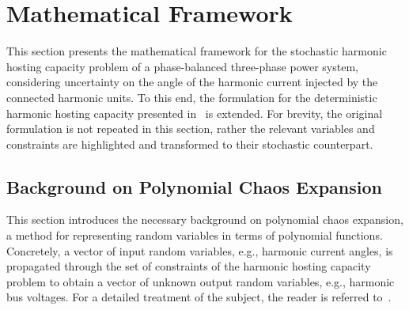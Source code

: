 \section{Mathematical Framework}
\label{sec:mathematical_framework}

This section presents the mathematical framework for the stochastic harmonic hosting capacity problem of a phase-balanced three-phase power system, considering uncertainty on the angle of the harmonic current injected by the connected harmonic units. To this end, the formulation for the deterministic harmonic hosting capacity presented in~\cite{vanacker_hosting_2026} is extended. For brevity, the original formulation is not repeated in this section, rather the relevant variables and constraints are highlighted and transformed to their stochastic counterpart. %

\subsection{Background on Polynomial Chaos Expansion}
\label{sec:polynomial_chaos_expansion}

This section introduces the necessary background on polynomial chaos expansion, a method for representing random variables in terms of polynomial functions. Concretely, a vector of input random variables, e.g., harmonic current angles, is propagated through the set of constraints of the harmonic hosting capacity problem to obtain a vector of unknown output random variables, e.g., harmonic bus voltages. For a detailed treatment of the subject, the reader is referred to~\cite{sullivan_introduction_2015}.

